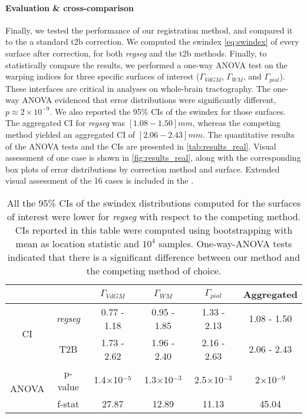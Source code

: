 \paragraph*{Evaluation \& cross-comparison}\label{sec:res_cc_evaluation}
%
Finally, we tested the performance of our registration method, and compared it to the
  a standard \gls*{t2b} correction.
We computed the \gls*{swindex} \eqref{eq:swindex} of every surface after correction,
  for both \emph{regseg} and the \gls*{t2b} methods.
Finally, to statistically compare the results, we performed a one-way ANOVA test
  on the warping indices for three specific surfaces of interest
  ($\Gamma_{VdGM}$, $\Gamma_{WM}$, and $\Gamma_{pial}$).
These interfaces are critical in analyses on whole-brain tractography.
The one-way ANOVA evidenced that error distributions were significantly different,
  $p \approx 2 \times 10^{-9}$.
We also reported the 95\% CIs of the \gls*{swindex} for those surfaces.
The aggregated CI for \emph{regseg} was $[1.08 - 1.50] mm$, whereas the competing method
  yielded an aggregated CI of $[2.06 - 2.43] mm$.
The quantitative results of the ANOVA tests and the CIs are presented in \autoref{tab:results_real}.
Visual assessment of one case is shown in \autoref{fig:results_real}, along with the corresponding
  box plots of error distributions by correction method and surface.
Extended visual assessment of the 16 cases is included in the .

\begin{table}
		\centering
		\footnotesize
		\tabcolsep=0.05cm
    \begin{tabular}{cccccc}
    & & $\Gamma_{VdGM}$  & $\Gamma_{WM}$ & $\Gamma_{pial}$ & Aggregated \\
    \hline
    \multirow{2}{*}{CI}
       & \emph{regseg}        & 0.77 - 1.18 & 0.95 - 1.85 & 1.33 - 2.13 & 1.08 - 1.50 \\
       & T2B                  & 1.73 - 2.62 & 1.96 - 2.40 & 2.16 - 2.63 & 2.06 - 2.43 \\
    \hline
    \multirow{2}{*}{ANOVA}
       & p-value  & 1.4$\times$10$^{-5}$& 1.3$\times$10$^{-3}$& 2.5$\times$10$^{-3}$ & 2$\times$10$^{-9}$ \\
       & f-stat   & 27.87               & 12.89               & 11.13                & 45.04 \\
    \hline
    \end{tabular}
    \caption{All the 95\% CIs of the \gls*{swindex} distributions computed for the
      surfaces of interest were lower for \emph{regseg} with respect to the competing
      method.
    CIs reported in this table were computed using bootstrapping with mean as location
      statistic and $10^4$ samples.
    One-way-ANOVA tests indicated that there is a significant difference between our method and
      the competing method of choice.
    }\label{tab:results_real}
\end{table}

